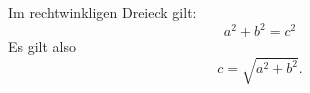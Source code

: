 Im rechtwinkligen Dreieck gilt:
\begin{displaymath}
    a^2 + b^2 = c^2
\end{displaymath}
Es gilt also \[c=\sqrt{a^2+b^2}.\]
